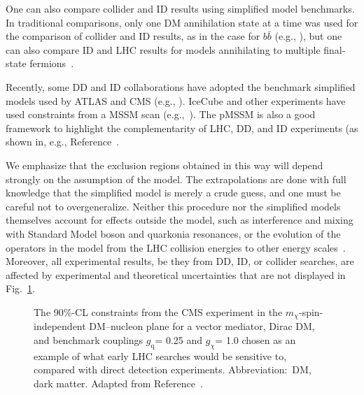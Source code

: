 \documentclass{ar-1col}
\newcommand{\chiDM}{\ensuremath{\chi}\xspace}
\newcommand{\gDM}{\ensuremath{g_{\chiDM}}\xspace}
\newcommand{\gdm}{\gDM}
\newcommand{\gq}{$g_{\mathrm{q}}$\xspace}
\newcommand{\mdm}{\ensuremath{m_{\chiDM}}\xspace}
\begin{document}
One can also compare collider and ID results using
simplified model benchmarks. In traditional comparisons, only one
DM annihilation state at a time was used for the comparison
of collider and ID results, as in the case for $b\bar{b}$ (e.g., ), but one can also compare ID and
LHC results for models annihilating to multiple final-state
fermions~\cite{Carpenter:2016thc}.

Recently, some DD and ID collaborations have adopted the benchmark
simplified models used by ATLAS and CMS (e.g.,
). IceCube and other
experiments have used constraints from a MSSM scan (e.g.,~). The pMSSM is also a good framework
to highlight the complementarity of LHC, DD, and ID experiments (as shown in, e.g.,
Reference~.

\begin{marginnote}[]
\end{marginnote}

We emphasize that the exclusion regions obtained in this
way will depend strongly on the assumption of the model. The
extrapolations are done with full knowledge that the simplified
model is merely a crude guess, and one must be careful not to
overgeneralize. Neither this procedure nor the
simplified models themselves account for effects outside the
model, such as interference and mixing with Standard Model boson and quarkonia
resonances, or the evolution of the operators in the model from
the LHC collision energies to other energy
scales~\cite{DEramo:2014nmf}. Moreover, all experimental results,
be they from DD, ID, or collider searches, are affected by experimental and
theoretical uncertainties that are not displayed in Fig.~\ref{fig:SICMS}.

\begin{figure}[!htpb]
\caption{The 90\%-CL constraints from the CMS experiment in the
\mdm-spin-independent DM--nucleon plane for a vector mediator,
Dirac DM, and benchmark couplings \gq = 0.25 and \gdm = 1.0 chosen as an example of what
early LHC searches would be sensitive to, compared with direct detection
experiments. Abbreviation:\ DM, dark matter. Adapted from Reference~.} \label{fig:SICMS}
\end{figure}
\end{document}
